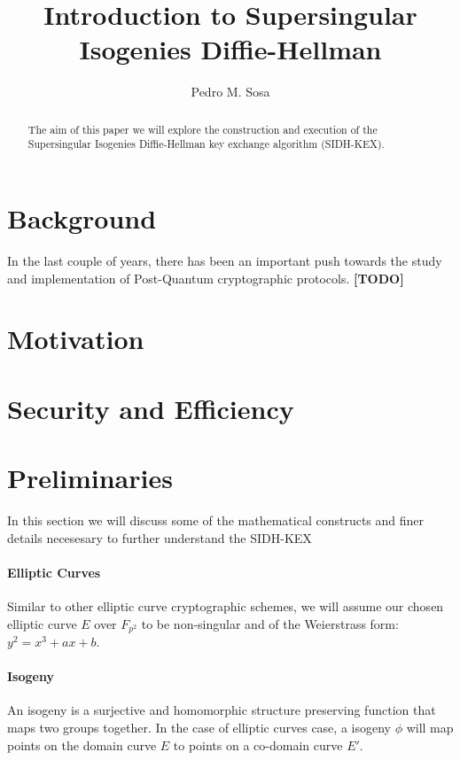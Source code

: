 \documentclass[10pt,twocolumn]{article} %
\title{Introduction to Supersingular Isogenies Diffie-Hellman}
\author{Pedro M. Sosa}
\begin{document}
\maketitle

\begin{abstract}
The aim of this paper we will explore the construction and execution of the Supersingular Isogenies Diffie-Hellman key exchange algorithm (SIDH-KEX). 
\end{abstract}

\section{Background}
In the last couple of years, there has been an important push towards the study and implementation of Post-Quantum cryptographic protocols. \textbf{[TODO]}

\section{Motivation}

\section{Security and Efficiency}


\section{Preliminaries}

In this section we will discuss some of the mathematical constructs and finer details necesesary to further understand the SIDH-KEX

\paragraph{Elliptic Curves}
Similar to other elliptic curve cryptographic schemes, we will assume our chosen elliptic curve $E$ over $F_{p^2}$ to be non-singular and of the Weierstrass form: $y^2 = x^3 + ax + b$.

\paragraph{Isogeny} An isogeny is a surjective and homomorphic structure preserving function that maps two groups together. In the case of elliptic curves case, a  isogeny $\phi$ will map points on the domain curve $E$ to points on a co-domain curve $E'$.
\end{document}
